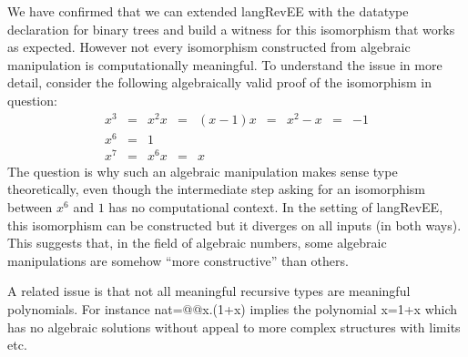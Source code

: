 \documentclass[preprint]{sigplanconf}
\begin{document}
We have confirmed that we can extended {{langRevEE}} with the datatype
declaration for binary trees and build a witness for this isomorphism
that works as expected. However not every isomorphism constructed from
algebraic manipulation is computationally meaningful. To understand the
issue in more detail, consider the following algebraically valid proof
of the isomorphism in question:
\[\begin{array}{rclclclcl}
x^3 &=& x^2 x &=& (x-1) x &=& x^2 - x &=& -1 \\
x^6 &=& 1 \\
x^7 &=& x^6 x &=& x
\end{array}\]
The question is why such an algebraic manipulation makes sense type
theoretically, even though the intermediate step asking for an isomorphism
between $x^6$ and $1$ has no computational context. In the setting of
{{langRevEE}}, this isomorphism can be constructed but it diverges on all
inputs (in both ways). This suggests that, in the field of algebraic numbers,
some algebraic manipulations are somehow 
``more constructive'' than others.

A related issue is that not all meaningful recursive types are
meaningful polynomials. For instance {{nat=@@x.(1+x)}} implies the
polynomial {{x=1+x}} which has no algebraic solutions without appeal
to more complex structures with limits etc. 





\end{document}
